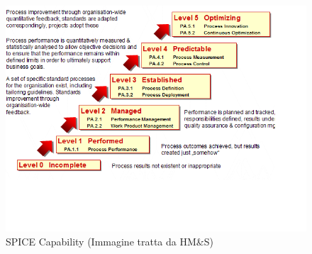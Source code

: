 \begin{figure}[!ht]
	\begin{center}
		\includegraphics[width=0.48\linewidth]{../immagini/Process_Level.jpg}
		\caption{SPICE Capability (Immagine tratta da HM\&S)}
	\end{center}
\end{figure}


	